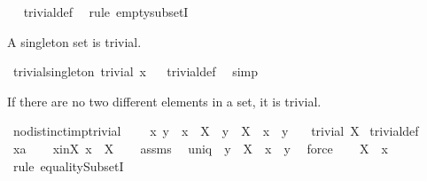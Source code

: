 \begin{isabellebody}
\isadelimproof
\ %
\endisadelimproof
%
\isatagproof
{}\isamarkupfalse%
\ trivial{\isacharunderscore}def\ \isamarkupfalse%
\ {\isacharparenleft}rule\ empty{\isacharunderscore}subsetI{\isacharparenright}%
\endisatagproof
{\isafoldproof}%
%
\isadelimproof
%
\endisadelimproof
%
\begin{isamarkuptext}%
A singleton set is trivial.%
\end{isamarkuptext}%
\isamarkuptrue%
\isamarkupfalse%
\ trivial{\isacharunderscore}singleton{\isacharcolon}\ {\isachardoublequoteopen}trivial\ {\isacharbraceleft}x{\isacharbraceright}{\isachardoublequoteclose}%
\isadelimproof
\ %
\endisadelimproof
%
\isatagproof
{}\isamarkupfalse%
\ trivial{\isacharunderscore}def\ \isamarkupfalse%
\ simp%
\endisatagproof
{\isafoldproof}%
%
\isadelimproof
%
\endisadelimproof
%
\begin{isamarkuptext}%
If there are no two different elements in a set, it is trivial.%
\end{isamarkuptext}%
\isamarkuptrue%
\isamarkupfalse%
\ no{\isacharunderscore}distinct{\isacharunderscore}imp{\isacharunderscore}trivial{\isacharcolon}\isanewline
\ \ \ {\isachardoublequoteopen}{\isasymforall}\ x\ y\ {\isachardot}\ x\ {\isasymin}\ X\ {\isasymand}\ y\ {\isasymin}\ X\ {\isasymlongrightarrow}\ x\ {\isacharequal}\ y{\isachardoublequoteclose}\isanewline
\ \ \ {\isachardoublequoteopen}trivial\ X{\isachardoublequoteclose}\isanewline
%
\isadelimproof
\isanewline
%
\endisadelimproof
%
\isatagproof
{}\isamarkupfalse%
\ trivial{\isacharunderscore}def\isanewline
{}\isamarkupfalse%
\ \isanewline
\ \ \isamarkupfalse%
\ x{\isacharcolon}{\isacharcolon}{\isacharprime}a\isanewline
\ \ \isamarkupfalse%
\ x{\isacharunderscore}in{\isacharunderscore}X{\isacharcolon}\ {\isachardoublequoteopen}x\ {\isasymin}\ X{\isachardoublequoteclose}\isanewline
\ \ \isamarkupfalse%
\ assms\ \isamarkupfalse%
\ uniq{\isacharcolon}\ {\isachardoublequoteopen}{\isasymforall}\ y\ {\isasymin}\ X\ {\isachardot}\ x\ {\isacharequal}\ y{\isachardoublequoteclose}\ \isamarkupfalse%
\ force\isanewline
\ \ \isamarkupfalse%
\ {\isachardoublequoteopen}X\ {\isacharequal}\ {\isacharbraceleft}x{\isacharbraceright}{\isachardoublequoteclose}\isanewline
\ \ \isamarkupfalse%
\ {\isacharparenleft}rule\ equalitySubsetI{\isacharparenright}\isanewline

\end{isabellebody}
